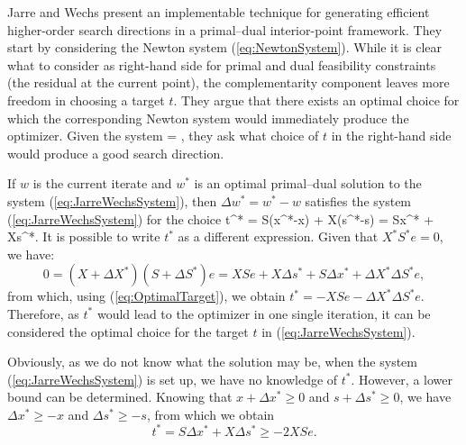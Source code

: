 Jarre and Wechs \cite{JarreWechs} %
present an implementable technique for generating efficient 
higher-order search directions in a primal--dual interior-point framework.
They start by considering the Newton system (\ref{eq:NewtonSystem}).
While it is clear what to consider as right-hand 
side for primal and dual feasibility constraints (the residual 
at the current point), the complementarity component leaves more 
freedom in choosing a target $t$. They argue that there exists 
an optimal choice for which the corresponding Newton system would 
immediately produce the optimizer.
Given the system
\be
\label{eq:JarreWechsSystem}
 =
\left[ \begin{array}{c}
    b-Ax \\ c-A^Ty-s \\ t
  \end{array} \right],
\ee
they ask what choice of $t$ in the right-hand side 
would produce a good search direction.

If $w$ is the current iterate and 
$w^*$ is an optimal primal--dual solution to 
the system (\ref{eq:JarreWechsSystem}), then 
$\Delta w^*= w^*-w$ satisfies the 
system (\ref{eq:JarreWechsSystem}) for the choice
\be  \label{eq:OptimalTarget}
  t^* = S(x^*-x) + X(s^*-s) = S\Delta x^* + X\Delta s^*.
\ee
It is possible to write $t^*$ as a different expression. 
Given that $X^*S^*e=0$, we have:
\[
  0 = (X+\Delta X^*)(S+\Delta S^*)e 
    = XSe + X\Delta s^* +S\Delta x^* +\Delta X^*\Delta S^*e,
\]
from which, using (\ref{eq:OptimalTarget}), we obtain
$t^* = -XSe - \Delta X^* \Delta S^*e$.
Therefore, as $t^*$ would lead to the optimizer in one single iteration,
it can be considered the optimal choice for the target $t$
in (\ref{eq:JarreWechsSystem}).

Obviously, as we do not know what the solution may be,
when the system (\ref{eq:JarreWechsSystem}) is set up, 
we have no knowledge of $t^*$. 
However, a lower bound can be determined. Knowing that 
$x+\Delta x^* \ge 0$ and $s+\Delta s^* \ge 0$, we have 
$\Delta x^* \ge -x$ and $\Delta s^* \ge -s$, from which we obtain
\[
  t^*= S\Delta x^* + X\Delta s^* \ge -2XSe.
\]

